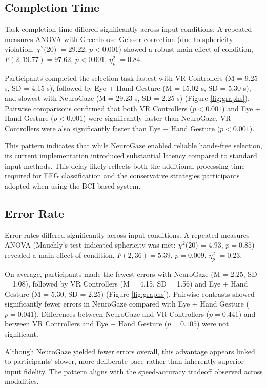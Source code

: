 \documentclass[utf8]{FrontiersinHarvard} %
\begin{document}
\subsection{Completion Time}
Task completion time differed significantly across input conditions. A repeated-measures ANOVA with Greenhouse-Geisser correction (due to sphericity violation, $\chi^2$(20) $= 29.22$, $p < 0.001$) showed a robust main effect of condition, $F(2, 19.77) = 97.62$, $p < 0.001$, $\eta_p^2$ $= 0.84$.

Participants completed the selection task fastest with VR Controllers (M = 9.25 s, SD = 4.15 s), followed by Eye + Hand Gesture (M = 15.02 s, SD = 5.30 s), and slowest with NeuroGaze (M = 29.23 s, SD = 2.25 s) (Figure \ref{fig:graphs}). Pairwise comparisons confirmed that both VR Controllers ($p < 0.001$) and Eye + Hand Gesture ($p < 0.001$) were significantly faster than NeuroGaze. VR Controllers were also significantly faster than Eye + Hand Gesture ($p < 0.001$).

This pattern indicates that while NeuroGaze enabled reliable hands-free selection, its current implementation introduced substantial latency compared to standard input methods. This delay likely reflects both the additional processing time required for EEG classification and the conservative strategies participants adopted when using the BCI-based system.


\subsection{Error Rate}
Error rates differed significantly across input conditions. A repeated-measures ANOVA (Mauchly's test indicated sphericity was met: $\chi^2$(20) = 4.93, $p = 0.85$) revealed a main effect of condition, $F(2, 36) = 5.39$, $p = 0.009$, $\eta_p^2$ $= 0.23$.

On average, participants made the fewest errors with NeuroGaze (M = 2.25, SD = 1.08), followed by VR Controllers (M = 4.15, SD = 1.56) and Eye + Hand Gesture (M = 5.30, SD = 2.25) (Figure \ref{fig:graphs}). Pairwise contrasts showed significantly fewer errors in NeuroGaze compared with Eye + Hand Gesture ($p = 0.041$). Differences between NeuroGaze and VR Controllers ($p = 0.441$) and between VR Controllers and Eye + Hand Gesture ($p = 0.105$) were not significant.

Although NeuroGaze yielded fewer errors overall, this advantage appears linked to participants' slower, more deliberate pace rather than inherently superior input fidelity. The pattern aligns with the speed-accuracy tradeoff observed across modalities.
\end{document}
